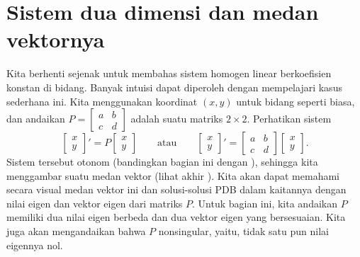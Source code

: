 
\sectionnewpage
\section{Sistem dua dimensi dan medan vektornya}
\label{sec:twodimaut}


Kita berhenti sejenak untuk membahas sistem homogen linear berkoefisien
konstan di bidang.
Banyak intuisi dapat diperoleh dengan mempelajari kasus sederhana ini.
Kita menggunakan koordinat $(x,y)$ untuk bidang seperti biasa,
dan andaikan
$P = \left[ \begin{smallmatrix} a & b \\ c & d \end{smallmatrix} \right]$ 
adalah suatu matriks $2 \times 2$.  Perhatikan sistem
\begin{equation} \label{pln:eq}
\begin{bmatrix} x \\ y \end{bmatrix} ' =
P \begin{bmatrix} x \\ y \end{bmatrix} 
\qquad 
\text{atau}
\qquad
\begin{bmatrix} x \\ y \end{bmatrix} ' =
\begin{bmatrix} a & b \\ c & d \end{bmatrix} 
\begin{bmatrix} x \\ y \end{bmatrix} 
.
\end{equation}
Sistem tersebut otonom (bandingkan bagian ini
dengan ),
sehingga kita menggambar suatu medan vektor (lihat akhir
).
Kita akan dapat memahami secara visual medan vektor ini
dan solusi-solusi PDB dalam kaitannya dengan
nilai eigen dan vektor eigen dari matriks $P$.
Untuk bagian ini,
kita andaikan $P$ memiliki dua nilai eigen berbeda dan dua vektor eigen yang
bersesuaian.
Kita juga akan mengandaikan bahwa $P$ nonsingular, yaitu,
tidak satu pun nilai eigennya nol.

\medskip

